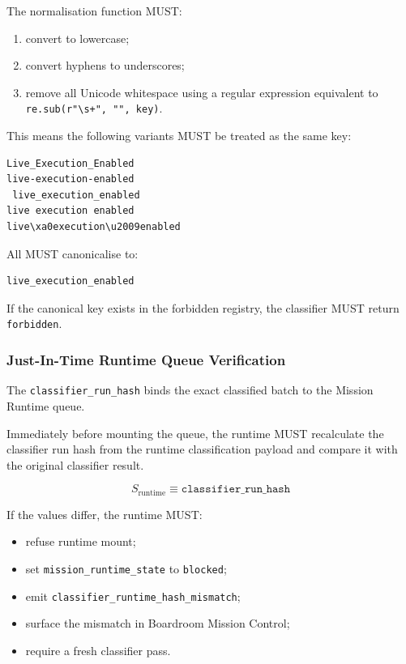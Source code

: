 The normalisation function MUST:

\begin{enumerate}
  \item convert to lowercase;
  \item convert hyphens to underscores;
  \item remove all Unicode whitespace using a regular expression equivalent to \texttt{re.sub(r"\textbackslash s+", "", key)}.
\end{enumerate}

This means the following variants MUST be treated as the same key:

\begin{verbatim}
Live_Execution_Enabled
live-execution-enabled
 live_execution_enabled
live execution enabled
live\xa0execution\u2009enabled
\end{verbatim}

All MUST canonicalise to:

\begin{verbatim}
live_execution_enabled
\end{verbatim}

If the canonical key exists in the forbidden registry, the classifier MUST return \texttt{forbidden}.

\subsubsection{Just-In-Time Runtime Queue Verification}

The \texttt{classifier\_run\_hash} binds the exact classified batch to the Mission Runtime queue.

Immediately before mounting the queue, the runtime MUST recalculate the classifier run hash from the runtime classification payload and compare it with the original classifier result.

\begin{equation}
S_{\mathrm{runtime}} \equiv \texttt{classifier\_run\_hash}
\end{equation}

If the values differ, the runtime MUST:

\begin{itemize}
  \item refuse runtime mount;
  \item set \texttt{mission\_runtime\_state} to \texttt{blocked};
  \item emit \texttt{classifier\_runtime\_hash\_mismatch};
  \item surface the mismatch in Boardroom Mission Control;
  \item require a fresh classifier pass.
\end{itemize}

